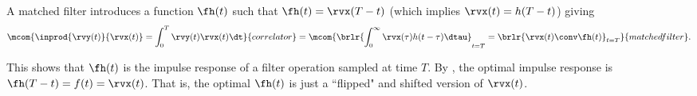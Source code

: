 A matched filter introduces a function $\fh(t)$ such that
$\fh(t) =\rvx(T-t)$ (which implies $\rvx(t)=h(T-t)$) giving
  \[
    \mcom{\inprod{\rvy(t)}{\rvx(t)} = \int_0^T \rvy(t)\rvx(t)\dt }
         {correlator}
    =
    \mcom{\brlr{\int_0^\infty \rvx(\tau)h(t-\tau)\dtau}_{t=T}
            = \brlr{\rvx(t)\conv \fh(t)}_{t=T}
         }{matched filter}.
  \]

This shows that $\fh(t)$ is the impulse response of a filter operation
sampled at time $T$. %
By , the optimal impulse response is
$\fh(T-t)=f(t)=\rvx(t)$.
That is, the optimal $\fh(t)$ is just a ``flipped" and shifted version of $\rvx(t)$.




